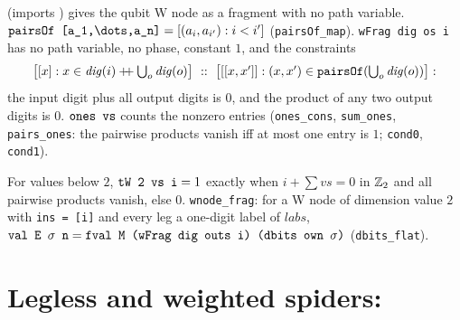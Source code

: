  (imports ) gives the qubit W node as a fragment with no path
variable. $\textnormal{\texttt{pairsOf [a\_\allowbreak{}1,\allowbreak{}\textbackslash{}dots,\allowbreak{}a\_\allowbreak{}n]}} = [(a_i,a_{i'}) : i<i']$ (\textnormal{\texttt{pairsOf\_\allowbreak{}map}}).
\textnormal{\texttt{wFrag dig os i}} has no path variable, no phase, constant $1$, and the constraints
\[
\bigl[[x] : x\in\mathit{dig}(i)\mathbin{+\!\!+}\textstyle\bigcup_o\mathit{dig}(o)\bigr]\ ::\ \bigl[[[x,x']] : (x,x')\in\textnormal{\texttt{pairsOf}}(\textstyle\bigcup_o\mathit{dig}(o))\bigr]:
\]
the input digit plus all output digits is $0$, and the product of any two output digits is $0$.
$\textnormal{\texttt{ones vs}}$ counts the nonzero entries (\textnormal{\texttt{ones\_\allowbreak{}cons}}, \textnormal{\texttt{sum\_\allowbreak{}ones}}, \textnormal{\texttt{pairs\_\allowbreak{}ones}}:
the pairwise products vanish iff at most one entry is $1$; \textnormal{\texttt{cond0}}, \textnormal{\texttt{cond1}}).
\begin{theorem}
For values below $2$, $\textnormal{\texttt{tW 2 vs i}} = 1$ exactly when $i+\sum vs = 0$ in $\mathbb{Z}_{2}$ and all pairwise
products vanish, else $0$. \textnormal{\texttt{wnode\_\allowbreak{}frag}}: for a W node of dimension value $2$ with
\textnormal{\texttt{ins = [i]}} and every leg a one-digit label of $labs$,
$\textnormal{\texttt{val E \ensuremath{\sigma} n}} = \textnormal{\texttt{fval M (\allowbreak{}wFrag dig outs i) (\allowbreak{}dbits own \ensuremath{\sigma})}}$ (\textnormal{\texttt{dbits\_\allowbreak{}flat}}).
\end{theorem}

\section{Legless and weighted spiders: \texorpdfstring{}{PathSumNetW}}\label{sec:lean-pathsum-netw}

